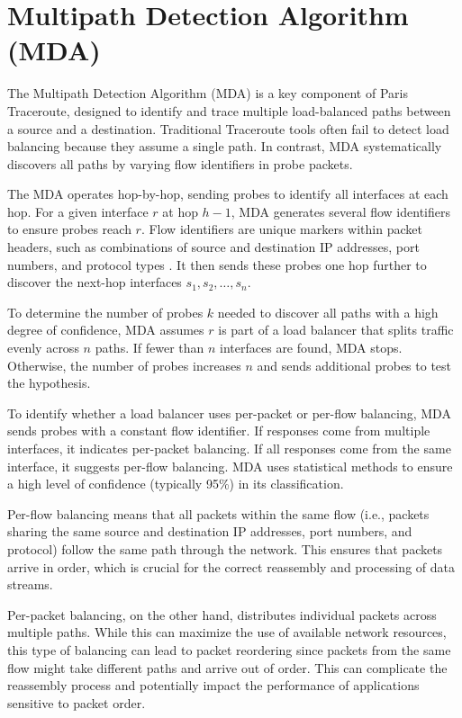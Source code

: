 \documentclass[12pt]{cwru_thesis}
\begin{document}
\section{Multipath Detection Algorithm (MDA)}

The Multipath Detection Algorithm (MDA) is a key component of Paris Traceroute, designed to identify and trace multiple load-balanced paths between a source and a destination. Traditional Traceroute tools often fail to detect load balancing because they assume a single path. In contrast, MDA systematically discovers all paths by varying flow identifiers in probe packets.

The MDA operates hop-by-hop, sending probes to identify all interfaces at each hop. For a given interface \(r\) at hop \(h-1\), MDA generates several flow identifiers to ensure probes reach \(r\). Flow identifiers are unique markers within packet headers, such as combinations of source and destination IP addresses, port numbers, and protocol types . It then sends these probes one hop further to discover the next-hop interfaces \(s_1, s_2, \ldots, s_n\).

To determine the number of probes \(k\) needed to discover all paths with a high degree of confidence, MDA assumes \(r\) is part of a load balancer that splits traffic evenly across \(n\) paths. If fewer than \(n\) interfaces are found, MDA stops. Otherwise, the number of probes increases \(n\) and sends additional probes to test the hypothesis.

To identify whether a load balancer uses per-packet or per-flow balancing, MDA sends probes with a constant flow identifier. If responses come from multiple interfaces, it indicates per-packet balancing. If all responses come from the same interface, it suggests per-flow balancing. MDA uses statistical methods to ensure a high level of confidence (typically 95\%) in its classification.

Per-flow balancing means that all packets within the same flow (i.e., packets sharing the same source and destination IP addresses, port numbers, and protocol) follow the same path through the network. This ensures that packets arrive in order, which is crucial for the correct reassembly and processing of data streams.

Per-packet balancing, on the other hand, distributes individual packets across multiple paths. While this can maximize the use of available network resources, this type of balancing can lead to packet reordering since packets from the same flow might take different paths and arrive out of order. This can complicate the reassembly process and potentially impact the performance of applications sensitive to packet order.
\end{document}
